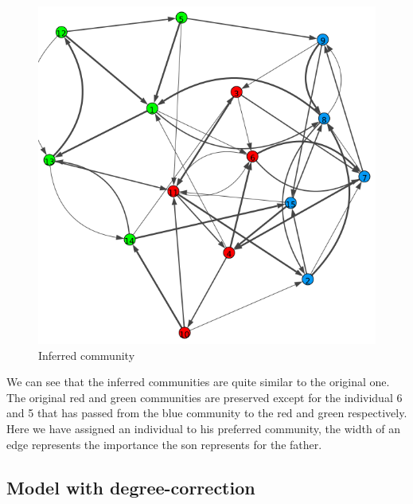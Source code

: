 \documentclass[12pt]{ociamthesis}  %
\begin{document}
	\begin{figure}
		\centering
		\includegraphics[width=\textwidth,height=\textheight,keepaspectratio]{OptimizationPlot}
		\caption{Inferred community}
		\label{label-image3}
	\end{figure}
	
	We can see that the inferred communities are quite similar to the original one. The original red and green communities are preserved except for the individual 6 and 5 that has passed from the blue community to the red and green respectively. Here we have assigned an individual to his preferred community, the width of an edge represents the importance the son represents for the father.
	\subsection{Model with degree-correction}
	
\end{document}
